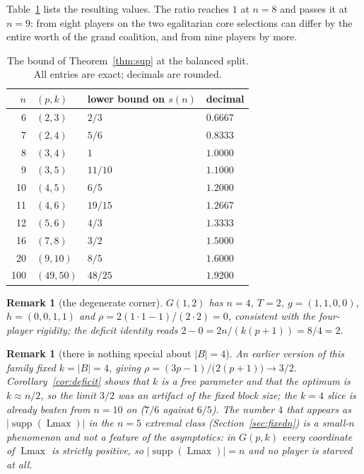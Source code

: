 \documentclass[11pt]{article}
\newtheorem{remark}[theorem]{Remark}
\newcommand{\Lmax}{\operatorname{Lmax}}
\newcommand{\supp}{\operatorname{supp}}
\begin{document}
Table~\ref{tab:values} lists the resulting values.  The ratio reaches $1$
at $n=8$ and passes it at $n=9$: from eight players on the two egalitarian
core selections can differ by the entire worth of the grand coalition, and
from nine players by more.

\begin{table}[t]
\centering
\begin{tabular}{@{}rlll@{}}
\toprule
$n$ & $(p,k)$ & lower bound on $s(n)$ & decimal\\
\midrule
 6 & $(2,3)$ & $2/3$ & $0.6667$\\
 7 & $(2,4)$ & $5/6$ & $0.8333$\\
 8 & $(3,4)$ & $1$ & $1.0000$\\
 9 & $(3,5)$ & $11/10$ & $1.1000$\\
10 & $(4,5)$ & $6/5$ & $1.2000$\\
11 & $(4,6)$ & $19/15$ & $1.2667$\\
12 & $(5,6)$ & $4/3$ & $1.3333$\\
16 & $(7,8)$ & $3/2$ & $1.5000$\\
20 & $(9,10)$ & $8/5$ & $1.6000$\\
100 & $(49,50)$ & $48/25$ & $1.9200$\\
\bottomrule
\end{tabular}
\caption{The bound of Theorem~\ref{thm:sup} at the balanced split.  All
entries are exact; decimals are rounded.}
\label{tab:values}
\end{table}

\begin{remark}[the degenerate corner]\label{rem:degenerate}
$G(1,2)$ has $n=4$, $T=2$, $g=(1,1,0,0)$, $h=(0,0,1,1)$ and
$\rho=2(1\cdot1-1)/(2\cdot2)=0$, consistent with the four-player rigidity;
the deficit identity reads $2-0=2n/(k(p+1))=8/4=2$.
\end{remark}

\begin{remark}[there is nothing special about $|B|=4$]\label{rem:notfour}
An earlier version of this family fixed $k=|B|=4$, giving
$\rho=(3p-1)/\bigl(2(p+1)\bigr)\to3/2$.  Corollary~\ref{cor:deficit} shows
that $k$ is a free parameter and that the optimum is $k\approx n/2$, so the
limit $3/2$ was an artifact of the fixed block size; the $k=4$ slice is
already beaten from $n=10$ on ($7/6$ against $6/5$).  The number $4$ that
appears as $|\supp(\Lmax)|$ in the $n=5$ extremal class
(Section~\ref{sec:fixedn}) is a small-$n$ phenomenon and not a feature of the
asymptotics: in $G(p,k)$ every coordinate of $\Lmax$ is strictly positive, so
$|\supp(\Lmax)|=n$ and no player is starved at all.
\end{remark}
\end{document}
